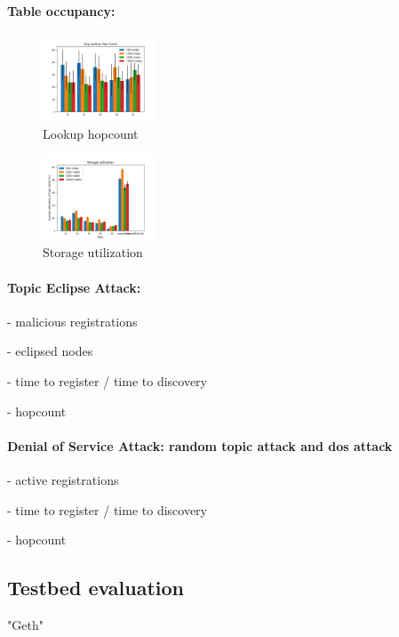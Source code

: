 \paragraph{\bf{Table occupancy}:}

\begin{figure}[h!]
\centering
\includegraphics[width=0.3\textwidth]{img/eval/lookup_hopcount.png}
\caption{Lookup hopcount}
\label{fig:hopcount}
\vspace{-0.15in}
\end{figure}


\begin{figure}[h!]
\centering
\includegraphics[width=0.3\textwidth]{img/eval/storage_utilisation.png}
\caption{Storage utilization}
\label{fig:utilisation}
\vspace{-0.15in}
\end{figure}

\paragraph{\bf{Topic Eclipse Attack:}}

- malicious registrations

- eclipsed nodes

- time to register / time to discovery

- hopcount 

\paragraph{\bf{Denial of Service Attack: random topic attack and dos attack}}


- active registrations

- time to register / time to discovery

- hopcount 

\subsection{Testbed evaluation}
"Geth"~\cite{go-ethereum}
